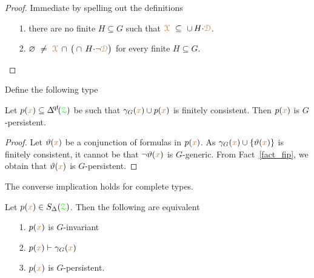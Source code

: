 \begin{proof}
  Immediate by spelling out the definitions
  \begin{itemize}
    \item[1.] there are no finite $H\subseteq G$ such that ${\color{brown}\EuScript X}\ \subseteq\ \cup\, H{\cdot}{\color{brown}\EuScript D}$.
    \item[2.] $\varnothing\ \neq\ {\color{brown}\EuScript X}\,\cap\,\big(\cap\, H{\cdot}\neg{\color{brown}\EuScript D}\big)$ for every finite $H\subseteq G$.\qedhere
  \end{itemize} 
\end{proof}

Define the following type


\begin{corollary}\label{corol_q_pers}
  Let $p({\mr x})\subseteq\qfDelta(\grZ)$ be such that $\gamma_G({\color{brown} x})\cup p({\color{brown} x})$ is finitely consistent.
  Then $p({\color{brown} x})$ is $G$-persistent.
\end{corollary}

\begin{proof}
  Let $\vartheta({\color{brown} x})$ be a conjunction of formulas in $p({\color{brown} x})$.
  As $\gamma_G({\color{brown} x})\cup\{\vartheta({\color{brown} x})\}$ is finitely consistent, it cannot be that $\neg\vartheta({\color{brown} x})$ is $G$-generic.
  From Fact~\ref{fact_fip}, we obtain that $\vartheta({\color{brown} x})$ is $G$-persistent.
\end{proof}

The converse implication holds for complete types.

\begin{theorem}\label{thm_generic_invariant}
  Let $p({\color{brown} x})\in S_\Delta({\color{green}\EuScript Z})$.
  Then the following are equivalent
  \begin{itemize}
    \item[1.] $p({\color{brown} x})$ is $G$-invariant
    \item[2.] $p({\color{brown} x})\vdash\gamma_G({\color{brown} x})$
    \item[3.] $p({\color{brown} x})$ is $G$-persistent.
  \end{itemize}
\end{theorem}

